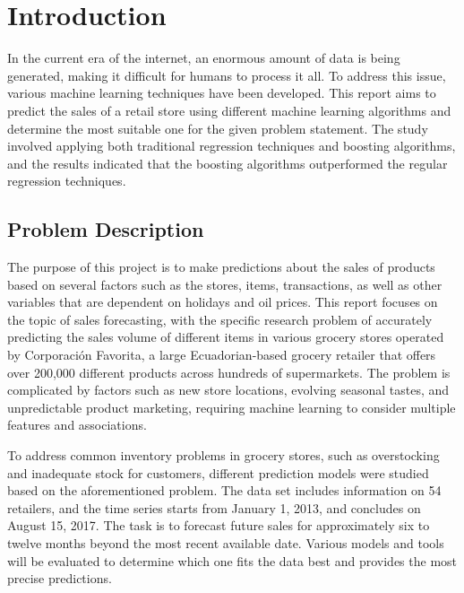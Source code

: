 %
%

\chapter{Introduction}

In the current era of the internet, an enormous amount of data is being generated, making it difficult for humans to process it all. To address this issue, various machine learning techniques have been developed. This report aims to predict the sales of a retail store using different machine learning algorithms and determine the most suitable one for the given problem statement. The study involved applying both traditional regression techniques and boosting algorithms, and the results indicated that the boosting algorithms outperformed the regular regression techniques.\cite{Krishna:2018}

\medskip

\section{Problem Description}

The purpose of this project is to make predictions about the sales of products based on several factors such as the stores, items, transactions, as well as other variables that are dependent on holidays and oil prices. This report focuses on the topic of sales forecasting, with the specific research problem of accurately predicting the sales volume of different items in various grocery stores operated by Corporación Favorita, a large Ecuadorian-based grocery retailer that offers over 200,000 different products across hundreds of supermarkets. The problem is complicated by factors such as new store locations, evolving seasonal tastes, and unpredictable product marketing, requiring machine learning to consider multiple features and associations. 

To address common inventory problems in grocery stores, such as overstocking and inadequate stock for customers, different prediction models were studied based on the aforementioned problem. The data set includes information on 54 retailers, and the time series starts from January 1, 2013, and concludes on August 15, 2017. The task is to forecast future sales for approximately six to twelve months beyond the most recent available date. Various models and tools will be evaluated to determine which one fits the data best and provides the most precise predictions.

